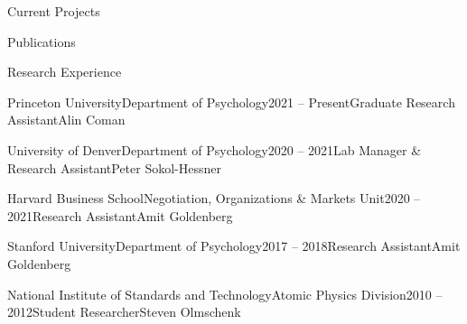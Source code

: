 \documentclass{cv} %
\begin{document}

\begin{cvSectionEmpty}{Current Projects}
    \printbibliography[
        heading=none,
        keyword=in-prep
    ]
\end{cvSectionEmpty}

\begin{cvSectionEmpty}{Publications}
    \printbibliography[
        heading=none,
        keyword=publications
    ]
\end{cvSectionEmpty}


\begin{cvSection}{Research Experience}

\begin{cvSubsectionResearch}{Princeton University}{Department of Psychology}{2021 -- Present}{Graduate Research Assistant}{Alin Coman}
\end{cvSubsectionResearch}

\begin{cvSubsectionResearch}{University of Denver}{Department of Psychology}{2020 -- 2021}{Lab Manager \& Research Assistant}{Peter Sokol-Hessner}
\end{cvSubsectionResearch}

\begin{cvSubsectionResearch}
{Harvard Business School}{Negotiation, Organizations \& Markets Unit}{2020 -- 2021}{Research Assistant}{Amit Goldenberg}
\end{cvSubsectionResearch}

\begin{cvSubsectionResearch}{Stanford University}{Department of Psychology}{2017 -- 2018}{Research Assistant}{Amit Goldenberg}
\end{cvSubsectionResearch}

\begin{cvSubsectionResearch}{National Institute of Standards and Technology}{Atomic Physics Division}{2010 -- 2012}{Student Researcher}{Steven Olmschenk}
\end{cvSubsectionResearch}

\end{cvSection}
\end{document}
